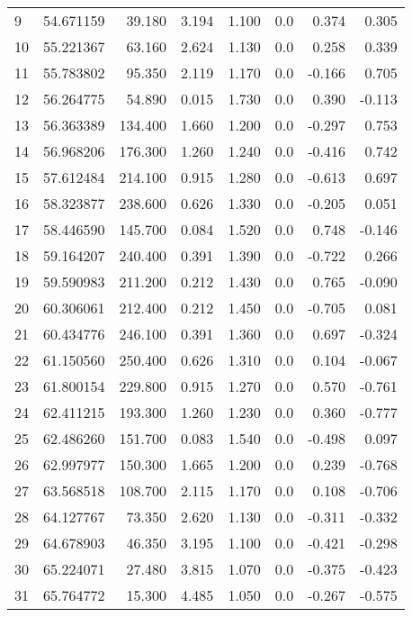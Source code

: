 {\begin{longtable}{lrrrrrrr}
9 & 54.671159 &  39.180 &  3.194 &    1.100 & 0.0 &   0.374 &    0.305\\
10 & 55.221367 &  63.160 &  2.624 &    1.130 & 0.0 &   0.258 &    0.339\\
11 & 55.783802 &  95.350 &  2.119 &    1.170 & 0.0 &  -0.166 &    0.705\\
12 & 56.264775 &  54.890 &  0.015 &    1.730 & 0.0 &   0.390 &   -0.113\\
13 & 56.363389 & 134.400 &  1.660 &    1.200 & 0.0 &  -0.297 &    0.753\\
14 & 56.968206 & 176.300 &  1.260 &    1.240 & 0.0 &  -0.416 &    0.742\\
15 & 57.612484 & 214.100 &  0.915 &    1.280 & 0.0 &  -0.613 &    0.697\\
16 & 58.323877 & 238.600 &  0.626 &    1.330 & 0.0 &  -0.205 &    0.051\\
17 & 58.446590 & 145.700 &  0.084 &    1.520 & 0.0 &   0.748 &   -0.146\\
18 & 59.164207 & 240.400 &  0.391 &    1.390 & 0.0 &  -0.722 &    0.266\\
19 & 59.590983 & 211.200 &  0.212 &    1.430 & 0.0 &   0.765 &   -0.090\\
20 & 60.306061 & 212.400 &  0.212 &    1.450 & 0.0 &  -0.705 &    0.081\\
21 & 60.434776 & 246.100 &  0.391 &    1.360 & 0.0 &   0.697 &   -0.324\\
22 & 61.150560 & 250.400 &  0.626 &    1.310 & 0.0 &   0.104 &   -0.067\\
23 & 61.800154 & 229.800 &  0.915 &    1.270 & 0.0 &   0.570 &   -0.761\\
24 & 62.411215 & 193.300 &  1.260 &    1.230 & 0.0 &   0.360 &   -0.777\\
25 & 62.486260 & 151.700 &  0.083 &    1.540 & 0.0 &  -0.498 &    0.097\\
26 & 62.997977 & 150.300 &  1.665 &    1.200 & 0.0 &   0.239 &   -0.768\\
27 & 63.568518 & 108.700 &  2.115 &    1.170 & 0.0 &   0.108 &   -0.706\\
28 & 64.127767 &  73.350 &  2.620 &    1.130 & 0.0 &  -0.311 &   -0.332\\
29 & 64.678903 &  46.350 &  3.195 &    1.100 & 0.0 &  -0.421 &   -0.298\\
30 & 65.224071 &  27.480 &  3.815 &    1.070 & 0.0 &  -0.375 &   -0.423\\
31 & 65.764772 &  15.300 &  4.485 &    1.050 & 0.0 &  -0.267 &   -0.575\\

\end{longtable}}
